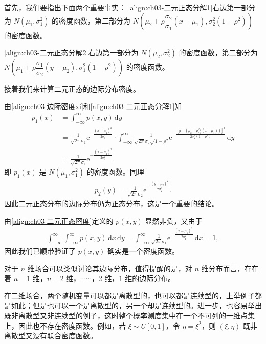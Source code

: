 \documentclass[../../main.tex]{subfiles}
\begin{document}
首先，我们要指出下面两个重要事实：
\eqref{align:ch03-二元正态分解1}右边第一部分为 $N(\mu_1,\sigma_1^{2})$ 的密度函数，第二部分为 $N\!\left(\mu_2+\rho\dfrac{\sigma_2}{\sigma_1}(x-\mu_1),\sigma_2^{2}(1-\rho^{2})\right)$ 的密度函数。

\eqref{align:ch03-二元正态分解2}右边第一部分为 $N(\mu_2,\sigma_2^{2})$ 的密度函数，第二部分为 $N\!\left(\mu_1+\rho\dfrac{\sigma_1}{\sigma_2}(y-\mu_2),\sigma_1^{2}(1-\rho^{2})\right)$ 的密度函数。

接着我们来计算二元正态的边际分布密度。

由\eqref{align:ch03-边际密度xi}和\eqref{align:ch03-二元正态分解1}知
\begin{align*}
p_1(x)&=\int_{-\infty}^{\infty}p(x,y)\,\mathrm{d}y\\
&=\frac{1}{\sqrt{2\pi}\sigma_1}\mathrm{e}^{-\frac{(x-\mu_1)^{2}}{2\sigma_1^{2}}}\cdot\int_{-\infty}^{\infty}\frac{1}{\sqrt{2\pi}\sigma_2\sqrt{1-\rho^{2}}}\mathrm{e}^{-\frac{\left[y-\left(\mu_2+\rho\frac{\sigma_2}{\sigma_1}(x-\mu_1)\right)\right]^{2}}{2\sigma_2^{2}(1-\rho^{2})}}\,\mathrm{d}y\\
&=\frac{1}{\sqrt{2\pi}\sigma_1}\mathrm{e}^{-\frac{(x-\mu_1)^{2}}{2\sigma_1^{2}}}.
\end{align*}
即 $p_1(x)$ 是 $N(\mu_1,\sigma_1^{2})$ 的密度函数。同理
\begin{align*}p_2(y)=\frac{1}{\sqrt{2\pi}\sigma_2}\mathrm{e}^{-\frac{(y-\mu_2)^{2}}{2\sigma_2^{2}}}.\end{align*}
因此二元正态分布的边际分布仍为正态分布，这是一个重要的结论。

由\eqref{align:ch03-二元正态密度}定义的 $p(x,y)$ 显然非负，又由于
\begin{align*}\int_{-\infty}^{\infty}\int_{-\infty}^{\infty}p(x,y)\,\mathrm{d}x\,\mathrm{d}y=\int_{-\infty}^{\infty}\frac{1}{\sqrt{2\pi}\sigma_1}\mathrm{e}^{-\frac{(x-\mu_1)^{2}}{2\sigma_1^{2}}}\,\mathrm{d}x=1,\end{align*}
因此我们已顺带验证了 $p(x,y)$ 确实是一个密度函数。

对于 $n$ 维场合可以类似讨论其边际分布，值得提醒的是，对 $n$ 维分布而言，存在着 $n-1$ 维，$n-2$ 维，$\cdots\cdots$，$2$ 维，$1$ 维的边际分布。

在二维场合，两个随机变量可以都是离散型的，也可以都是连续型的，上举例子都是如此；但是也可以一个是离散型的，另一个却是连续型的。进一步，也容易举出既非离散型又非连续型的例子，这时整个概率测度集中在一个不可列的一维点集上，因此也不存在密度函数。例如，若 $\xi\sim U[0,1]$，令 $\eta=\xi^{2}$，则 $(\xi,\eta)$ 既非离散型又没有联合密度函数。
\end{document}
